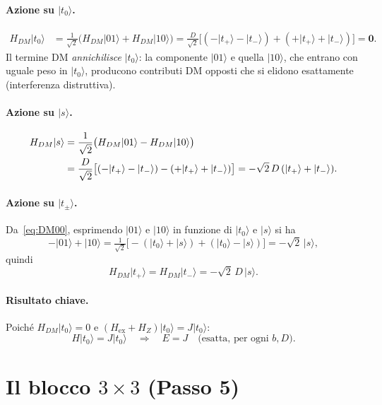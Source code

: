 \documentclass[11pt,a4paper]{article}
\newcommand{\ket}[1]{\lvert #1 \rangle}
\theoremstyle{definition}
\begin{document}
\paragraph{Azione su $\ket{t_0}$.}
\begin{align}
H_{DM}\ket{t_0}
&=\frac{1}{\sqrt2}\bigl(H_{DM}\ket{01}+H_{DM}\ket{10}\bigr)
=\frac{D}{\sqrt2}\bigl[(-\ket{t_+}-\ket{t_-})+(+\ket{t_+}+\ket{t_-})\bigr]=\mathbf{0}.
\label{eq:DMt0}
\end{align}
Il termine DM \emph{annichilisce} $\ket{t_0}$: la componente $\ket{01}$ e quella $\ket{10}$, che
entrano con uguale peso in $\ket{t_0}$, producono contributi DM opposti che si elidono esattamente
(interferenza distruttiva).

\paragraph{Azione su $\ket{s}$.}
\begin{align}
H_{DM}\ket{s}
&=\frac{1}{\sqrt2}\bigl(H_{DM}\ket{01}-H_{DM}\ket{10}\bigr)\notag\\
&=\frac{D}{\sqrt2}\bigl[(-\ket{t_+}-\ket{t_-})-(+\ket{t_+}+\ket{t_-})\bigr]
=-\sqrt{2}\,D\,(\ket{t_+}+\ket{t_-}).
\label{eq:DMs}
\end{align}

\paragraph{Azione su $\ket{t_\pm}$.} Da~\eqref{eq:DM00}, esprimendo $\ket{01}$ e $\ket{10}$ in
funzione di $\ket{t_0}$ e $\ket{s}$ si ha
\[
-\ket{01}+\ket{10}
=\tfrac{1}{\sqrt2}\bigl[-(\ket{t_0}+\ket{s})+(\ket{t_0}-\ket{s})\bigr]=-\sqrt2\,\ket{s},
\]
quindi
\begin{equation}
H_{DM}\ket{t_+}=H_{DM}\ket{t_-}=-\sqrt{2}\,D\,\ket{s}.
\label{eq:DMtpm}
\end{equation}

\paragraph{Risultato chiave.} Poiché $H_{DM}\ket{t_0}=0$ e $(H_{\mathrm{ex}}+H_Z)\ket{t_0}=J\ket{t_0}$:
\begin{equation}
\boxed{H\ket{t_0}=J\ket{t_0}\quad\Longrightarrow\quad E=J\quad\text{(esatta, per ogni }b, D).}
\label{eq:Et0}
\end{equation}

\FloatBarrier
\section{Il blocco $3\times3$ (Passo 5)}
\end{document}
